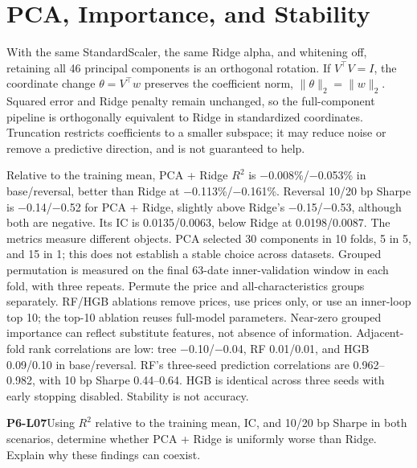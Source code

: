 \clearpage\section{PCA, Importance, and Stability}
\begin{proposition}
With the same StandardScaler, the same Ridge alpha, and whitening off, retaining all 46 principal components is an orthogonal rotation. If \(V^\top V=I\), the coordinate change \(\theta=V^\top w\) preserves the coefficient norm, \(\|\theta\|_2=\|w\|_2\). Squared error and Ridge penalty remain unchanged, so the full-component pipeline is orthogonally equivalent to Ridge in standardized coordinates. Truncation restricts coefficients to a smaller subspace; it may reduce noise or remove a predictive direction, and is not guaranteed to help.
\end{proposition}
Relative to the training mean, PCA + Ridge \(R^2\) is −0.008\%/−0.053\% in base/reversal, better than Ridge at −0.113\%/−0.161\%. Reversal 10/20 bp Sharpe is −0.14/−0.52 for PCA + Ridge, slightly above Ridge's −0.15/−0.53, although both are negative. Its IC is 0.0135/0.0063, below Ridge at 0.0198/0.0087. The metrics measure different objects. PCA selected 30 components in 10 folds, 5 in 5, and 15 in 1; this does not establish a stable choice across datasets.
Grouped permutation is measured on the final 63-date inner-validation window in each fold, with three repeats. Permute the price and all-characteristics groups separately. RF/HGB ablations remove prices, use prices only, or use an inner-loop top 10; the top-10 ablation reuses full-model parameters. Near-zero grouped importance can reflect substitute features, not absence of information. Adjacent-fold rank correlations are low: tree −0.10/−0.04, RF 0.01/0.01, and HGB 0.09/0.10 in base/reversal. RF's three-seed prediction correlations are 0.962–0.982, with 10 bp Sharpe 0.44–0.64. HGB is identical across three seeds with early stopping disabled. Stability is not accuracy.
\begin{yourturn}\textbf{P6-L07}\quad Using \(R^2\) relative to the training mean, IC, and 10/20 bp Sharpe in both scenarios, determine whether PCA + Ridge is uniformly worse than Ridge. Explain why these findings can coexist.\workspace[4]\end{yourturn}


